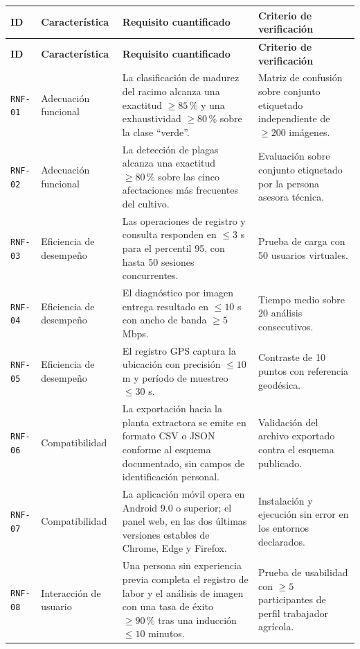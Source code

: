 \documentclass[11pt,a4paper]{article}
\newcommand{\id}[1]{\texttt{#1}}
\begin{document}
\begin{longtable}{|C{1.3cm}|L{2.3cm}|L{6.2cm}|L{3.4cm}|}
\hline
{}\textbf{ID} & \textbf{Característica} & \textbf{Requisito cuantificado} & \textbf{Criterio de verificación} \\
\hline
\endfirsthead
\hline
{}\textbf{ID} & \textbf{Característica} & \textbf{Requisito cuantificado} & \textbf{Criterio de verificación} \\
\hline
\endhead
\id{RNF-01} & Adecuación funcional & La clasificación de madurez del racimo alcanza una exactitud
$\geq 85\,\%$ y una exhaustividad $\geq 80\,\%$ sobre la clase ``verde''. & Matriz de confusión
sobre conjunto etiquetado independiente de $\geq 200$ imágenes. \\ \hline
\id{RNF-02} & Adecuación funcional & La detección de plagas alcanza una exactitud $\geq 80\,\%$
sobre las cinco afectaciones más frecuentes del cultivo. & Evaluación sobre conjunto etiquetado por
la persona asesora técnica. \\ \hline
\id{RNF-03} & Eficiencia de desempeño & Las operaciones de registro y consulta responden en
$\leq 3$ s para el percentil 95, con hasta 50 sesiones concurrentes. & Prueba de carga con 50
usuarios virtuales. \\ \hline
\id{RNF-04} & Eficiencia de desempeño & El diagnóstico por imagen entrega resultado en $\leq 10$ s
con ancho de banda $\geq 5$ Mbps. & Tiempo medio sobre 20 análisis consecutivos. \\ \hline
\id{RNF-05} & Eficiencia de desempeño & El registro GPS captura la ubicación con precisión
$\leq 10$ m y período de muestreo $\leq 30$ s. & Contraste de 10 puntos con referencia geodésica.
\\ \hline
\id{RNF-06} & Compatibilidad & La exportación hacia la planta extractora se emite en formato CSV o
JSON conforme al esquema documentado, sin campos de identificación personal. & Validación del
archivo exportado contra el esquema publicado. \\ \hline
\id{RNF-07} & Compatibilidad & La aplicación móvil opera en Android 9.0 o superior; el panel web,
en las dos últimas versiones estables de Chrome, Edge y Firefox. & Instalación y ejecución sin
error en los entornos declarados. \\ \hline
\id{RNF-08} & Interacción de usuario & Una persona sin experiencia previa completa el registro de
labor y el análisis de imagen con una tasa de éxito $\geq 90\,\%$ tras una inducción $\leq 10$
minutos. & Prueba de usabilidad con $\geq 5$ participantes de perfil trabajador agrícola. \\ \hline

\end{longtable}
\end{document}
